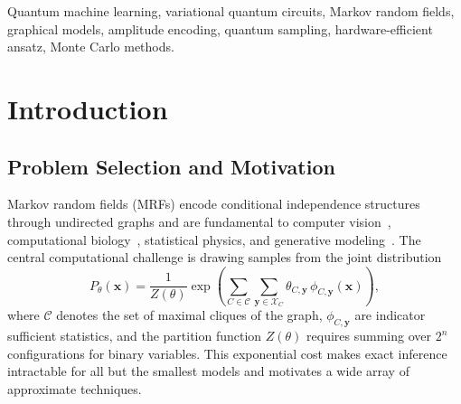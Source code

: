 \documentclass[conference,10pt]{IEEEtran}
\begin{document}
\begin{abstract}
We also report a multi-trial MPS scaling study (three seeds per point, $n$ up to $40$) showing $\chi=32$ achieves $F=0.721\pm0.059$ at $n=40$, and a matched-budget VQC vs.\ MPS comparison at $n=8,10,12$ showing VQC fidelities below MPS at every measured point ($(F_{\mathrm{VQC}}, F_{\mathrm{MPS}}) = (0.306, 0.990), (0.210, 0.958), (0.165, 0.878)$ at compressions $10.7\times$, $34.1\times$, $113.8\times$); we report this as a negative result for shallow hardware-efficient ans\"atze. All code and data at \url{https://github.com/arulrhikm/QuantumDGM}.
\end{abstract}

\begin{IEEEkeywords}
Quantum machine learning, variational quantum circuits, Markov random fields, graphical models, amplitude encoding, quantum sampling, hardware-efficient ansatz, Monte Carlo methods.
\end{IEEEkeywords}

\section{Introduction}

\subsection{Problem Selection and Motivation}

Markov random fields (MRFs) encode conditional independence structures through undirected graphs and are fundamental to computer vision~\cite{li2009markov}, computational biology~\cite{kamisetty2013coevolution}, statistical physics, and generative modeling~\cite{salakhutdinov2009deep}. The central computational challenge is drawing samples from the joint distribution
\begin{equation}
P_\theta(\mathbf{x}) = \frac{1}{Z(\theta)}\exp\!\left(\sum_{C\in\mathcal{C}}\sum_{\boldsymbol{y}\in\mathcal{X}_C}\theta_{C,\boldsymbol{y}}\,\phi_{C,\boldsymbol{y}}(\mathbf{x})\right),
\label{eq:mrf}
\end{equation}
where $\mathcal{C}$ denotes the set of maximal cliques of the graph, $\phi_{C,\boldsymbol{y}}$ are indicator sufficient statistics, and the partition function $Z(\theta)$ requires summing over $2^n$ configurations for binary variables. This exponential cost makes exact inference intractable for all but the smallest models and motivates a wide array of approximate techniques.
\end{document}
